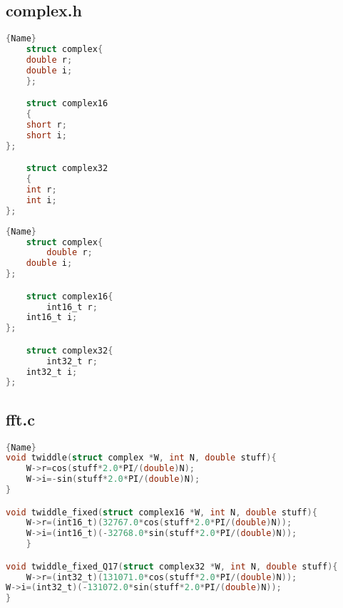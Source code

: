 \documentclass[a4paper]{article}
\begin{document}
\subsection{complex.h}
\noindent\begin{minipage}{.45\textwidth}
    \begin{lstlisting}[caption=code 1 1,frame=tlrb, language=C]{Name}
    struct complex{
    double r;
    double i;
    };

    struct complex16
    {
    short r;
    short i;
};

    struct complex32
    {
    int r;
    int i;
};
    \end{lstlisting}
\end{minipage}\hfill
\begin{minipage}{.45\textwidth}
    \begin{lstlisting}[caption=code 2,frame=tlrb, language=C]{Name}
    struct complex{
        double r;
    double i;
};

    struct complex16{
        int16_t r;
    int16_t i;
};

    struct complex32{
        int32_t r;
    int32_t i;
};
    \end{lstlisting}
\end{minipage}




\subsection{fft.c}
\begin{lstlisting}[caption=code 3,frame=tlrb, language=C]{Name}
void twiddle(struct complex *W, int N, double stuff){
    W->r=cos(stuff*2.0*PI/(double)N);
    W->i=-sin(stuff*2.0*PI/(double)N);
}

void twiddle_fixed(struct complex16 *W, int N, double stuff){
    W->r=(int16_t)(32767.0*cos(stuff*2.0*PI/(double)N));
    W->i=(int16_t)(-32768.0*sin(stuff*2.0*PI/(double)N));
    }

void twiddle_fixed_Q17(struct complex32 *W, int N, double stuff){
    W->r=(int32_t)(131071.0*cos(stuff*2.0*PI/(double)N));
W->i=(int32_t)(-131072.0*sin(stuff*2.0*PI/(double)N));
}
\end{lstlisting}
\end{document}
